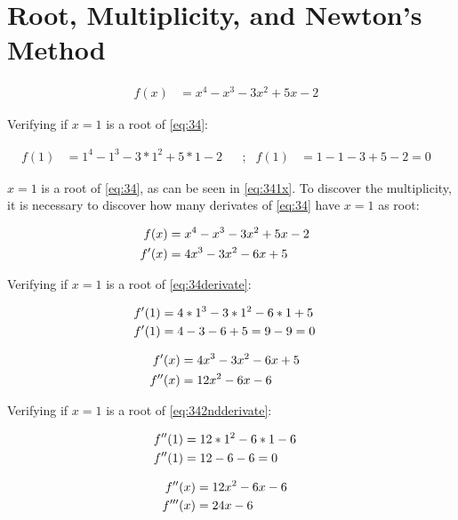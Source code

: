 \section{Root, Multiplicity, and Newton's Method}
	
	\begin{align}
		f(x) &= x^{4} - x^{3} - 3x^{2} + 5x - 2&
	\label{eq:34}
	\end{align}

	Verifying if $x=1$ is a root of \cref{eq:34}:

	\begin{align}
		f(1) &= 1^{4} - 1^{3} - 3*1^{2} + 5*1 - 2& &;&
		f(1) &= 1 - 1 - 3 + 5 - 2 = 0& 
	\label{eq:341x}
	\end{align}

	$x=1$ is a root of \cref{eq:34}, as can be seen in \cref{eq:341x}. To discover the multiplicity, it is necessary to discover how many derivates of \cref{eq:34} have $x=1$ as root:

	\begin{align}
		f(x) &= x^{4} - x^{3} - 3x^{2} + 5x - 2& \notag \\
		f'(x) &= 4x^{3} - 3x^{2} - 6x + 5&
	\label{eq:34derivate}
	\end{align}

	Verifying if $x=1$ is a root of \cref{eq:34derivate}:

	\begin{align}
		f'(1) &= 4*1^{3} - 3*1^{2} - 6*1 + 5& \notag \\
		f'(1) &= 4 - 3 - 6 + 5 = 9 - 9 = 0 &
	\label{eq:34derivate1x}
	\end{align}

	\begin{align}
		f'(x) &= 4x^{3} - 3x^{2} - 6x + 5& \notag \\
		f''(x) &= 12x^{2} - 6x - 6&
	\label{eq:342ndderivate}
	\end{align}

	Verifying if $x=1$ is a root of \cref{eq:342ndderivate}:

	\begin{align}
		f''(1) &= 12*1^{2} - 6*1 - 6& \notag \\
		f''(1) &= 12 - 6 - 6 = 0&
	\label{eq:332ndderivate1x}
	\end{align}

	\begin{align}
		f''(x) &= 12x^{2} - 6x - 6& \notag \\
		f'''(x) &= 24x - 6&
	\label{eq:343rdderivate}
	\end{align}

